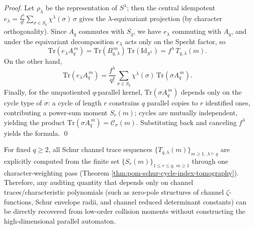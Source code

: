 \begin{proof}
Let \(\rho_\lambda\) be the representation of \(S^\lambda\); then the central idempotent
\(
e_\lambda=\frac{f^\lambda}{q!}\sum_{\sigma\in S_q}\chi^\lambda(\sigma)\,\sigma
\)
gives the \(\lambda\)-equivariant projection (by character orthogonality).
Since \(A_q\) commutes with \(S_q\), we have \(e_\lambda\) commuting with \(A_q\), and under the equivariant decomposition \(e_\lambda\) acts only on the Specht factor, so
\[
\mathrm{Tr}(e_\lambda A_q^{\,m})=\mathrm{Tr}(B_{q,\lambda}^{\,m})\,\mathrm{Tr}(\mathrm{Id}_{S^\lambda})
=f^\lambda\,T_{q,\lambda}(m).
\]
On the other hand,
\[
\mathrm{Tr}(e_\lambda A_q^{\,m})
=\frac{f^\lambda}{q!}\sum_{\sigma\in S_q}\chi^\lambda(\sigma)\,\mathrm{Tr}(\sigma A_q^{\,m}).
\]
Finally, for the unquotiented \(q\)-parallel kernel, \(\mathrm{Tr}(\sigma A_q^{\,m})\) depends only on the cycle type of \(\sigma\):
a cycle of length \(r\) constrains \(q\) parallel copies to \(r\) identified ones, contributing a power-sum moment \(S_r(m)\); cycles are mutually independent, yielding the product
\(
\mathrm{Tr}(\sigma A_q^{\,m})=\mathcal{C}_\sigma(m)
\).
Substituting back and canceling \(f^\lambda\) yields the formula. \qed
\end{proof}

\begin{corollary}\label{cor:pom-schur-spectrum-audit-from-low-moments}
For fixed \(q\ge 2\), all Schur channel trace sequences \(\{T_{q,\lambda}(m)\}_{m\ge 1,\ \lambda\vdash q}\)
are explicitly computed from the finite set \(\{S_r(m)\}_{1\le r\le q,\ m\ge 1}\) through one character-weighting pass (Theorem \ref{thm:pom-schur-cycle-index-tomography}).
Therefore, any auditing quantity that depends only on channel traces/characteristic polynomials (such as zero-pole structures of channel \(\zeta\)-functions, Schur envelope radii, and channel reduced determinant constants)
can be directly recovered from low-order collision moments without constructing the high-dimensional parallel automaton.
\end{corollary}







